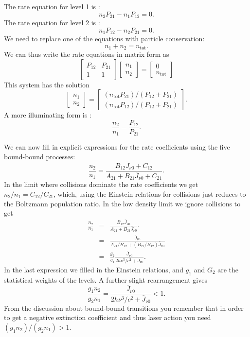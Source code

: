 \documentclass[12pt]{article}
\numberwithin{equation}{section}
\def\Jbar{\ensuremath{\overline{J}_{\nu0}}}
\newcommand{\be}{\begin{equation}}
\newcommand{\ee}{\end{equation}}
\newcommand{\bea}{\begin{eqnarray}}
\newcommand{\eea}{\end{eqnarray}}
\begin{document}
The rate equation for level 1 is :
\be
 n_2 P_{21} - n_1 P_{12} = 0.
\ee
The rate equation for level 2 is :
\be
 n_1 P_{12} - n_2 P_{21} = 0.
\ee
We need to replace one of the equations with particle conservation:
\be
n_1 + n_2 = n_\mathrm{tot}.
\ee
We can thus write the rate equations in matrix form as
\be
\begin{bmatrix}
  P_{12} & P_{21} \\
  1 & 1
 \end{bmatrix}
 \begin{bmatrix}
  n_1 \\
  n_2
 \end{bmatrix}
 =
  \begin{bmatrix}
  0 \\
  n_\mathrm{tot}
 \end{bmatrix}
\ee
This system has the solution
\be
\begin{bmatrix}
  n_1 \\
  n_2
 \end{bmatrix}
 =
  \begin{bmatrix}
   (n_\mathrm{tot} P_{21})/(P_{12}+P_{21}) \\
  (n_\mathrm{tot} P_{12})/(P_{12}+P_{21})
 \end{bmatrix}.
\ee
A more illuminating form is :
\be
\frac{n_2}{n_1} = \frac{P_{12}}{P_{21}}.
\ee

We can now fill in explicit expressions for the rate coefficients using the five bound-bound processes:
\be
\frac{n_2}{n_1} = \frac{B_{12} \Jbar + C_{12}}{A_{21}+ B_{21} \Jbar + C_{21}}.
\ee
In the limit where collisions dominate the rate coefficients we get $n_2/n_1=C_{12}/C_{21}$, which, using the Einstein relations for collisions just reduces to the Boltzmann population ratio.
In the low density limit we ignore collisions to get
\bea
\frac{n_2}{n_1} &=& \frac{B_{12} \Jbar}{A_{21}+ B_{21} \Jbar}. \nonumber \\
                        &=& \frac{\Jbar}{A_{21}/B_{12} + (B_{21}/B_{12}) \Jbar} \nonumber \\
                        &=&\frac{g_2}{g_1} \frac{\Jbar}{ 2h\nu^3/c^2 + \Jbar}.	
\eea
In the last expression we filled in the Einstein relations, and $g_1$ and $G_2$ are the statistical weights of the levels. A further slight rearrangement gives
\be
\frac{g_1 n_2}{g_2 n_1} =  \frac{\Jbar}{ 2h\nu^3/c^2 + \Jbar} < 1.
\ee
From the discussion about  bound-bound transitions you remember that in order to get a negative extinction coefficient and thus laser action you need $(g_1 n_2)/(g_2 n_1) > 1$. 
\end{document}
